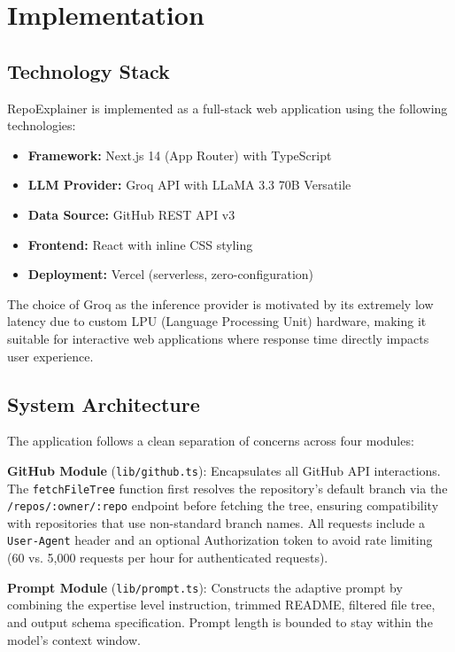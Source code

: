 \documentclass[conference]{IEEEtran}
\begin{document}
\section{Implementation}

\subsection{Technology Stack}

RepoExplainer is implemented as a full-stack web application using the following technologies:

\begin{itemize}
    \item \textbf{Framework:} Next.js 14 (App Router) with TypeScript
    \item \textbf{LLM Provider:} Groq API with LLaMA 3.3 70B Versatile
    \item \textbf{Data Source:} GitHub REST API v3
    \item \textbf{Frontend:} React with inline CSS styling
    \item \textbf{Deployment:} Vercel (serverless, zero-configuration)
\end{itemize}

The choice of Groq as the inference provider is motivated by its extremely low latency due to custom LPU (Language Processing Unit) hardware, making it suitable for interactive web applications where response time directly impacts user experience.

\subsection{System Architecture}

The application follows a clean separation of concerns across four modules:

\textbf{GitHub Module} (\texttt{lib/github.ts}): Encapsulates all GitHub API interactions. The \texttt{fetchFileTree} function first resolves the repository's default branch via the \texttt{/repos/:owner/:repo} endpoint before fetching the tree, ensuring compatibility with repositories that use non-standard branch names. All requests include a \texttt{User-Agent} header and an optional Authorization token to avoid rate limiting (60 vs. 5,000 requests per hour for authenticated requests).

\textbf{Prompt Module} (\texttt{lib/prompt.ts}): Constructs the adaptive prompt by combining the expertise level instruction, trimmed README, filtered file tree, and output schema specification. Prompt length is bounded to stay within the model's context window.
\end{document}
